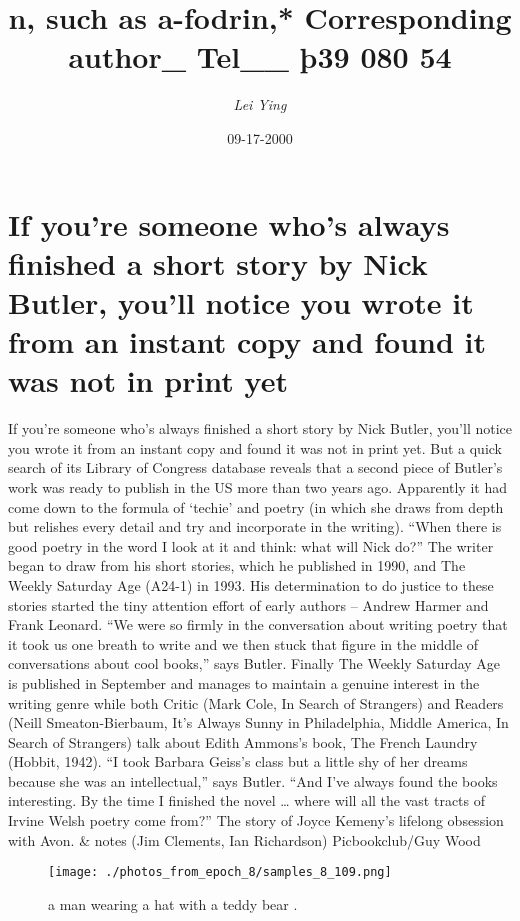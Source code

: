 \documentclass{article}%
\title{n, such as a{-}fodrin,* Corresponding author\_ Tel\_\_ þ39 080 54}%
\author{\textit{Lei Ying}}%
\date{09-17-2000}%
\begin{document}
%
\normalsize%
\maketitle%
\section{If you’re someone who’s always finished a short story by Nick Butler, you’ll notice you wrote it from an instant copy and found it was not in print yet}%
\label{sec:IfyouresomeonewhosalwaysfinishedashortstorybyNickButler,youllnoticeyouwroteitfromaninstantcopyandfounditwasnotinprintyet}%
If you’re someone who’s always finished a short story by Nick Butler, you’ll notice you wrote it from an instant copy and found it was not in print yet. But a quick search of its Library of Congress database reveals that a second piece of Butler’s work was ready to publish in the US more than two years ago. Apparently it had come down to the formula of ‘techie’ and poetry (in which she draws from depth but relishes every detail and try and incorporate in the writing). “When there is good poetry in the word I look at it and think: what will Nick do?” The writer began to draw from his short stories, which he published in 1990, and The Weekly Saturday Age (A24{-}1) in 1993. His determination to do justice to these stories started the tiny attention effort of early authors – Andrew Harmer and Frank Leonard. “We were so firmly in the conversation about writing poetry that it took us one breath to write and we then stuck that figure in the middle of conversations about cool books,” says Butler.\newline%
Finally The Weekly Saturday Age is published in September and manages to maintain a genuine interest in the writing genre while both Critic (Mark Cole, In Search of Strangers) and Readers (Neill Smeaton{-}Bierbaum, It’s Always Sunny in Philadelphia, Middle America, In Search of Strangers) talk about Edith Ammons’s book, The French Laundry (Hobbit, 1942). “I took Barbara Geiss’s class but a little shy of her dreams because she was an intellectual,” says Butler. “And I’ve always found the books interesting. By the time I finished the novel … where will all the vast tracts of Irvine Welsh poetry come from?”\newline%
The story of Joyce Kemeny’s lifelong obsession with Avon. \& notes (Jim Clements, Ian Richardson)\newline%
Picbookclub/Guy Wood\newline%

%


\begin{figure}[h!]%
\centering%
\texttt{[image: ./photos\_from\_epoch\_8/samples\_8\_109.png]}%
\caption{a man wearing a hat with a teddy bear .}%
\end{figure}

%
\end{document}
